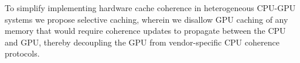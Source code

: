 %
To simplify implementing hardware cache
coherence in heterogeneous CPU-GPU systems 
we propose selective caching, wherein we disallow GPU caching of any memory that
would require coherence updates to propagate between the CPU and GPU, thereby
decoupling the GPU from vendor-specific CPU coherence protocols.

